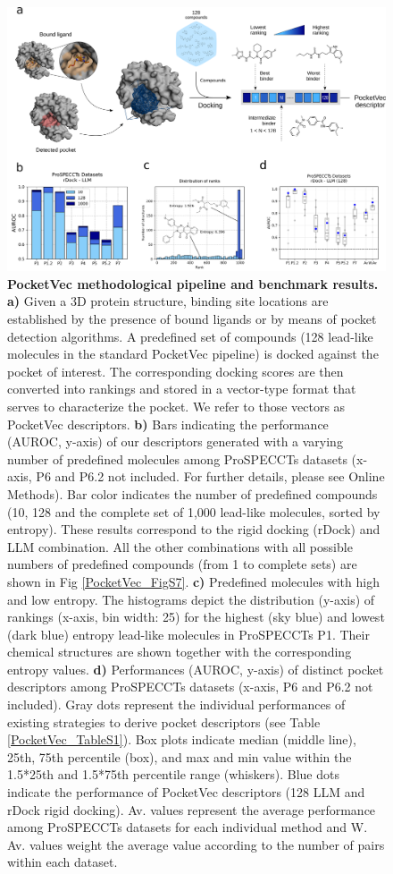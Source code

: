 \begin{figure}[htbp]
  \centering
  \includegraphics[width=\linewidth]{figures/PocketVec/Main/Fig1.png} 
  \caption{
    \textbf{PocketVec methodological pipeline and benchmark results.} 
    \textbf{a)} Given a 3D protein structure, binding site locations are established by the presence of bound ligands or by means of pocket detection algorithms. A predefined set of compounds (128 lead-like molecules in the standard PocketVec pipeline) is docked against the pocket of interest. The corresponding docking scores are then converted into rankings and stored in a vector-type format that serves to characterize the pocket. We refer to those vectors as PocketVec descriptors.
    \textbf{b)} Bars indicating the performance (AUROC, y-axis) of our descriptors generated with a varying number of predefined molecules among ProSPECCTs datasets (x-axis, P6 and P6.2 not included. For further details, please see Online Methods). Bar color indicates the number of predefined compounds (10, 128 and the complete set of 1,000 lead-like molecules, sorted by entropy). These results correspond to the rigid docking (rDock) and LLM combination. All the other combinations with all possible numbers of predefined compounds (from 1 to complete sets) are shown in Fig \ref{PocketVec_FigS7}.
    \textbf{c)} Predefined molecules with high and low entropy. The histograms depict the distribution (y-axis) of rankings (x-axis, bin width: 25) for the highest (sky blue) and lowest (dark blue) entropy lead-like molecules in ProSPECCTs P1. Their chemical structures are shown together with the corresponding entropy values.
    \textbf{d)} Performances (AUROC, y-axis) of distinct pocket descriptors among ProSPECCTs datasets (x-axis, P6 and P6.2 not included). Gray dots represent the individual performances of existing strategies to derive pocket descriptors (see Table \ref{PocketVec_TableS1}). Box plots indicate median (middle line), 25th, 75th percentile (box), and max and min value within the 1.5*25th and 1.5*75th percentile range (whiskers). Blue dots indicate the performance of PocketVec descriptors (128 LLM and rDock rigid docking). Av. values represent the average performance among ProSPECCTs datasets for each individual method and W. Av. values weight the average value according to the number of pairs within each dataset.
  }
  \label{PocketVec_Fig1}
\end{figure}


